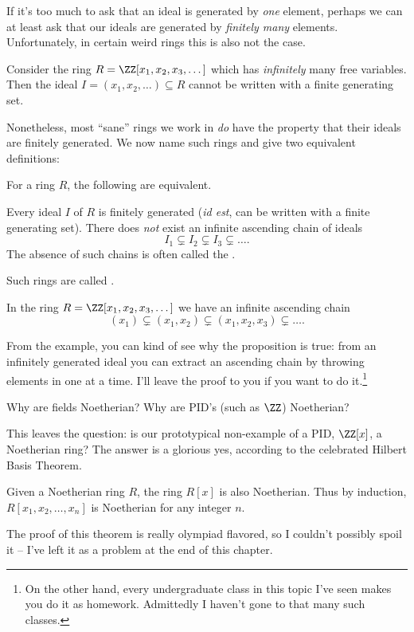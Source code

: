 If it's too much to ask that an ideal is generated by \emph{one} element,
perhaps we can at least ask that our ideals are generated by \emph{finitely many} elements.
Unfortunately, in certain weird rings this is also not the case.
\begin{example}
	Consider the ring $R = \ZZ[x_1, x_2, x_3, \dots]$
	which has \emph{infinitely} many free variables.
	Then the ideal $I = (x_1, x_2, \dots) \subseteq R$
	cannot be written with a finite generating set.
\end{example}
Nonetheless, most ``sane'' rings we work in \emph{do} have the property that their ideals are finitely generated.
We now name such rings and give two equivalent definitions:
\begin{proposition}
	For a ring $R$, the following are equivalent.
	\begin{enumerate}[(a)]
		\ii Every ideal $I$ of $R$ is finitely generated (\emph{id est}, can be written with a finite generating set).
		\ii There does \emph{not} exist an infinite ascending chain of ideals
		\[ I_1 \subsetneq I_2 \subsetneq I_3 \subsetneq \dots. \]
		The absence of such chains is often called the .
	\end{enumerate}
	Such rings are called .
\end{proposition}
\begin{example}
	In the ring $R = \ZZ[x_1, x_2, x_3, \dots]$ we have
	an infinite ascending chain
	\[ (x_1) \subsetneq (x_1, x_2) \subsetneq (x_1,x_2,x_3) \subsetneq \dots. \]
\end{example}
From the example, you can kind of see why the proposition is true:
from an infinitely generated ideal you can extract an ascending chain
by throwing elements in one at a time.
I'll leave the proof to you if you want to do it.\footnote{On the other hand, every undergraduate class in this topic I've seen makes you do it as homework. Admittedly I haven't gone to that many such classes.}

\begin{ques}
	Why are fields Noetherian?
	Why are PID's (such as $\ZZ$) Noetherian?
\end{ques}
This leaves the question:
is our prototypical non-example of a PID,
$\ZZ[x]$, a Noetherian ring?
The answer is a glorious yes,
according to the celebrated Hilbert Basis Theorem.
\begin{theorem}
	Given a Noetherian ring $R$,
	the ring $R[x]$ is also Noetherian.
	Thus by induction, $R[x_1, x_2, \dots, x_n]$ is Noetherian
	for any integer $n$.
	\label{thm:hilbert_basis}
\end{theorem}
The proof of this theorem is really olympiad flavored, so I couldn't possibly spoil it -- I've
left it as a problem at the end of this chapter.

